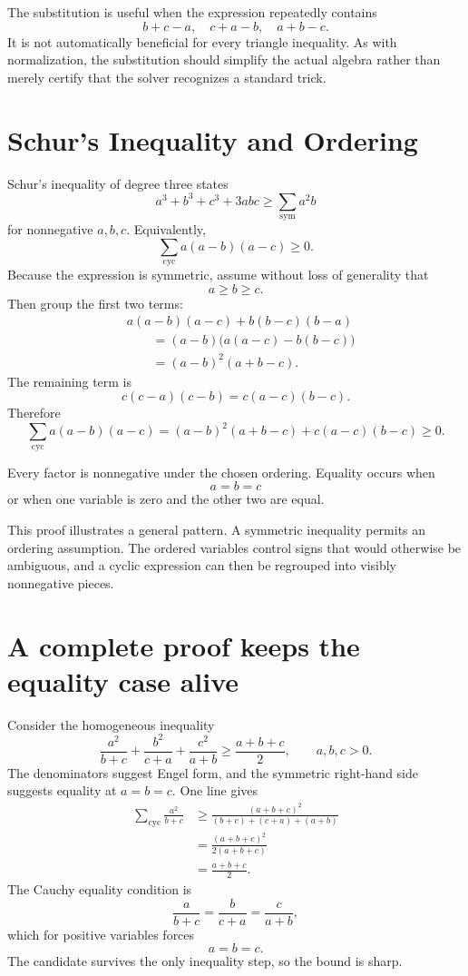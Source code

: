 The substitution is useful when the expression repeatedly contains
\[
  b+c-a,
  \quad
  c+a-b,
  \quad
  a+b-c.
\]
It is not automatically beneficial for every triangle inequality.  As with normalization, the substitution should simplify the actual algebra rather than merely certify that the solver recognizes a standard trick.

\section{Schur's Inequality and Ordering}

Schur's inequality of degree three states
\[
  a^3+b^3+c^3+3abc
  \ge
  \sum_{\mathrm{sym}}a^2b
\]
for nonnegative \(a,b,c\).  Equivalently,
\[
  \sum_{\mathrm{cyc}}a(a-b)(a-c)\ge0.
\]
Because the expression is symmetric, assume without loss of generality that
\[
  a\ge b\ge c.
\]
Then group the first two terms:
\[
\begin{aligned}
&a(a-b)(a-c)+b(b-c)(b-a)\\
&\qquad=(a-b)\bigl(a(a-c)-b(b-c)\bigr)\\
&\qquad=(a-b)^2(a+b-c).
\end{aligned}
\]
The remaining term is
\[
  c(c-a)(c-b)=c(a-c)(b-c).
\]
Therefore
\[
  \sum_{\mathrm{cyc}}a(a-b)(a-c)
  =(a-b)^2(a+b-c)+c(a-c)(b-c)\ge0.
\]

Every factor is nonnegative under the chosen ordering.  Equality occurs when
\[
  a=b=c
\]
or when one variable is zero and the other two are equal.

This proof illustrates a general pattern.  A symmetric inequality permits an ordering assumption.  The ordered variables control signs that would otherwise be ambiguous, and a cyclic expression can then be regrouped into visibly nonnegative pieces.

\section{A complete proof keeps the equality case alive}

Consider the homogeneous inequality
\[
  \frac{a^2}{b+c}
  +\frac{b^2}{c+a}
  +\frac{c^2}{a+b}
  \ge\frac{a+b+c}{2},
  \qquad a,b,c>0.
\]
The denominators suggest Engel form, and the symmetric right-hand side suggests equality at \(a=b=c\).  One line gives
\[
\begin{aligned}
  \sum_{\mathrm{cyc}}\frac{a^2}{b+c}
  &\ge
  \frac{(a+b+c)^2}{(b+c)+(c+a)+(a+b)}\\
  &=\frac{(a+b+c)^2}{2(a+b+c)}\\
  &=\frac{a+b+c}{2}.
\end{aligned}
\]
The Cauchy equality condition is
\[
  \frac{a}{b+c}
  =\frac{b}{c+a}
  =\frac{c}{a+b},
\]
which for positive variables forces
\[
  a=b=c.
\]
The candidate survives the only inequality step, so the bound is sharp.

